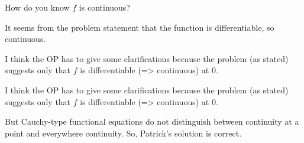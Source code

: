 


\begin{solution}
	\begin{tcolorbox} How do you know $f$ is continuous?\end{tcolorbox}
It seems from the problem statement that the function is differentiable, so continuous.
\end{solution}



\begin{solution}
	I think the OP has to give some clarifications because the problem (as stated) suggests only that $f$ is differentiable (=> continuous) at $0$.
\end{solution}



\begin{solution}
	\begin{tcolorbox}I think the OP has to give some clarifications because the problem (as stated) suggests only that $f$ is differentiable (=> continuous) at $0$.\end{tcolorbox}

But Cauchy-type functional equations do not distinguish between continuity at a point and everywhere continuity.  So, Patrick's solution is correct.
\end{solution}




